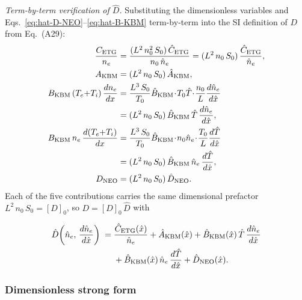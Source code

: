 \documentclass[twocolumn,secnumarabic,amssymb, nobibnotes, aps, prd]{revtex4-2}
\renewcommand{\ne}{n_{e}}  %
\begin{document}
\textit{Term-by-term verification of $\hat{D}$.}
Substituting the dimensionless variables and
Eqs.~\eqref{eq:hat-D-NEO}--\eqref{eq:hat-B-KBM} term-by-term into the
SI definition of $D$ from Eq.~(A29):
\begin{align}
  \frac{C_{\mathrm{ETG}}}{\ne}
  &= \frac{(L^{2}\,n_{0}^{2}\,S_{0})\,\hat{C}_{\mathrm{ETG}}}{n_{0}\,\hat{n}_{e}}
   = (L^{2}\,n_{0}\,S_{0})\,\frac{\hat{C}_{\mathrm{ETG}}}{\hat{n}_{e}},
  \label{eq:term-ETG-A8}
  \\
  A_{\mathrm{KBM}}
  &= (L^{2}\,n_{0}\,S_{0})\,\hat{A}_{\mathrm{KBM}},
  \label{eq:term-A-A8}
  \\
  B_{\mathrm{KBM}}\,(T_{e}{+}T_{i})\,\frac{d\ne}{dx}
  &= \frac{L^{3}\,S_{0}}{T_{0}}\hat{B}_{\mathrm{KBM}}\!\cdot\! T_{0}\hat{T}\!\cdot\!\frac{n_{0}}{L}\frac{d\hat{n}_{e}}{d\hat{x}}
  \notag\\
  &= (L^{2}\,n_{0}\,S_{0})\,\hat{B}_{\mathrm{KBM}}\,\hat{T}\,\frac{d\hat{n}_{e}}{d\hat{x}},
  \label{eq:term-B1-A8}
  \\
  B_{\mathrm{KBM}}\,\ne\,\frac{d(T_{e}{+}T_{i})}{dx}
  &= \frac{L^{3}\,S_{0}}{T_{0}}\hat{B}_{\mathrm{KBM}}\!\cdot\! n_{0}\hat{n}_{e}\!\cdot\!\frac{T_{0}}{L}\frac{d\hat{T}}{d\hat{x}}
  \notag\\
  &= (L^{2}\,n_{0}\,S_{0})\,\hat{B}_{\mathrm{KBM}}\,\hat{n}_{e}\,\frac{d\hat{T}}{d\hat{x}},
  \label{eq:term-B2-A8}
  \\
  D_{\mathrm{NEO}}
  &= (L^{2}\,n_{0}\,S_{0})\,\hat{D}_{\mathrm{NEO}}.
  \label{eq:term-NEO-A8}
\end{align}
Each of the five contributions carries the same dimensional prefactor
$L^{2}\,n_{0}\,S_{0} = [D]_{0}$, so $D = [D]_{0}\,\hat{D}$ with
\begin{widetext}
\begin{align}
  \hat{D}\!\left(\hat{n}_{e},\,\frac{d\hat{n}_{e}}{d\hat{x}}\right)
  \;=\;& \frac{\hat{C}_{\mathrm{ETG}}(\hat{x})}{\hat{n}_{e}}
       + \hat{A}_{\mathrm{KBM}}(\hat{x})
       + \hat{B}_{\mathrm{KBM}}(\hat{x})\,\hat{T}\,\frac{d\hat{n}_{e}}{d\hat{x}}
  \notag \\
       &+ \hat{B}_{\mathrm{KBM}}(\hat{x})\,\hat{n}_{e}\,\frac{d\hat{T}}{d\hat{x}}
       + \hat{D}_{\mathrm{NEO}}(\hat{x}).
  \label{eq:hat-D-A8}
\end{align}
\end{widetext}

\subsubsection{Dimensionless strong form}
\end{document}
